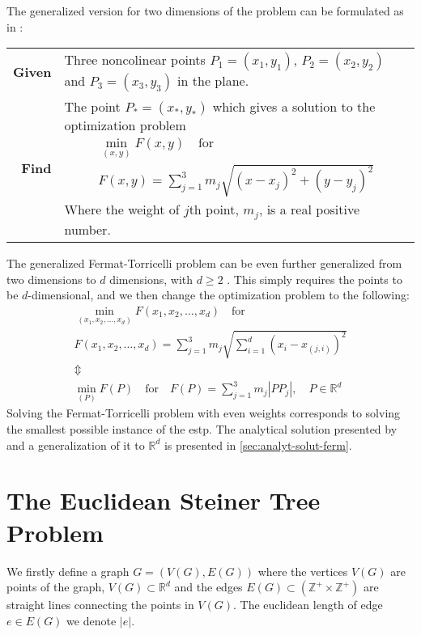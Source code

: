The generalized version for two dimensions of the problem can be formulated as in
\textcite{uteshev2014}:
%
\begin{center}
  \begin{tabular}{rp{9cm}}
    \toprule
    \textbf{Given} & Three noncolinear points $P_1 = (x_1, y_1)$, $P_2 = (x_2,
                     y_2)$ and $P_3 = (x_3, y_3)$ in the plane. \\
    \textbf{Find} & The point $P_\ast = (x_\ast, y_\ast)$ which gives a solution
                    to the optimization problem
                    \begin{gather}
                      \min_{(x,y)} F(x,y) \quad \text{for} \\
                      F(x,y) = \sum_{j=1}^3 m_j \sqrt{{(x-x_j)}^2 + {(y-y_j)}^2}
                    \end{gather}
    Where the weight of $j$th point, $m_j$, is a real positive number. \\
    \bottomrule
  \end{tabular}
\end{center}
%
The generalized Fermat-Torricelli problem can be even further generalized from
two dimensions to $d$ dimensions, with $d \ge 2$
\cite{fermattorricelliproblem}. This simply requires the points to be
$d$-dimensional, and we then change the optimization problem to the following:
%
\begin{gather}
  \min_{(x_1, x_2, \ldots, x_d)} F(x_1, x_2, \ldots, x_d) \quad \text{for} \\
  F(x_1, x_2, \ldots, x_d) = \sum_{j=1}^3 m_j
  \sqrt{\sum_{i=1}^d {(x_i - x_{(j,i)})}^2 }
  \\ \Updownarrow \\
  \label{eq:4}
  \min_{(P)} F(P) \quad \text{for} \quad
  F(P) = \sum_{j=1}^3 m_j | P P_j |, \quad P \in \mathbb{R}^d
\end{gather}
%
Solving the Fermat-Torricelli problem with even weights corresponds to solving
the smallest possible instance of the \acl{estp}. The analytical solution
presented by~\textcite{uteshev2014} and a generalization of it to $\mathbb{R}^d$ is
presented in \cref{sec:analyt-solut-ferm}.

\section{The Euclidean Steiner Tree Problem}
\label{sec:eucl-stein-tree}

We firstly define a graph $G = (V(G), E(G))$ where the vertices $V(G)$ are
points of the graph, $V(G) \subset \mathbb{R}^d$ and the edges
$E(G) \subset (\mathbb{Z}^{+} \times \mathbb{Z}^{+})$ are straight lines connecting the points in
$V(G)$. The euclidean length of edge $e \in E(G)$ we denote $|e|$.

